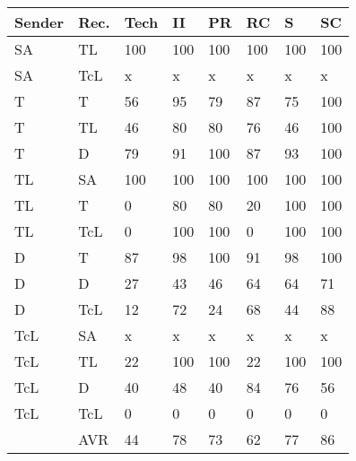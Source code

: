\begin{tabularx}{\columnwidth}{|l|X|X|X|X|X|X|X|}
\hline
Sender & Rec.  & Tech & II   & PR   & RC   & S    & SC	  \\\hline
SA     & TL    & 100  & 100  & 100  & 100  & 100  & 100   \\\hline
SA     & TcL   & x    & x    & x    & x    & x    & x     \\\hline
T      & T     & 56   & 95   & 79   & 87   & 75   & 100   \\\hline
T      & TL    & 46   & 80   & 80   & 76   & 46   & 100   \\\hline
T      & D     & 79   & 91   & 100  & 87   & 93   & 100   \\\hline
TL     & SA    & 100  & 100  & 100  & 100  & 100  & 100   \\\hline
TL     & T     & 0    & 80   & 80   & 20   & 100  & 100   \\\hline
TL     & TcL   & 0    & 100  & 100  & 0    & 100  & 100   \\\hline
D      & T     & 87   & 98   & 100  & 91   & 98   & 100   \\\hline
D      & D     & 27   & 43   & 46   & 64   & 64   & 71    \\\hline
D      & TcL   & 12   & 72   & 24   & 68   & 44   & 88    \\\hline
TcL    & SA    & x    & x    & x    & x    & x    & x     \\\hline
TcL    & TL    & 22   & 100  & 100  & 22   & 100  & 100   \\\hline
TcL    & D     & 40   & 48   & 40   & 84   & 76   & 56    \\\hline
TcL    & TcL   & 0    & 0    & 0    & 0    & 0    & 0     \\\hline
       & AVR   & 44   & 78   & 73   & 62   & 77   & 86    \\\hline
\end{tabularx}